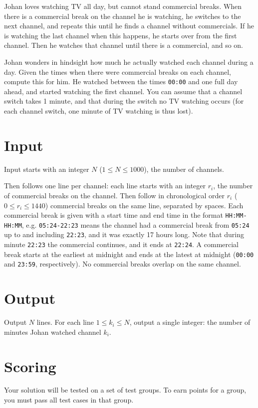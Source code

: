 Johan loves watching TV all day, but cannot stand commercial breaks. When there is a commercial break on the channel
he is watching, he switches to the next channel, and repeats this until he finds a channel without commercials. If he is watching
the last channel when this happens, he starts over from the first channel. Then he watches that channel until there is a commercial, and so on.

Johan wonders in hindsight how much he actually watched each channel during a day. Given the times when there were commercial breaks on each channel,
compute this for him. He watched between the times \texttt{00:00} and one full day ahead, and started watching the first channel.
You can assume that a channel switch takes 1 minute, and that during the switch no TV watching occurs (for each channel switch, one minute of TV watching is thus lost).

\section*{Input}
Input starts with an integer $N$ ($1 \leq N \leq 1000$), the number of channels.

Then follows one line per channel: each line starts with an integer $r_i$, the number of commercial breaks on the channel.
Then follow in chronological order $r_i$ ($0 \leq r_i \leq 1440$) commercial breaks on the same line, separated by spaces.
Each commercial break is given with a start time and end time in the format \texttt{HH:MM-HH:MM}, e.g. \texttt{05:24-22:23} means the channel had
a commercial break from \texttt{05:24} up to and including \texttt{22:23}, and it was exactly 17 hours long. Note that during minute \texttt{22:23} the commercial continues,
and it ends at \texttt{22:24}. A commercial break starts at the earliest at midnight and ends at the latest at midnight (\texttt{00:00} and \texttt{23:59}, respectively).
No commercial breaks overlap on the same channel.

\section*{Output}
Output $N$ lines. For each line $1 \leq k_i \leq N$, output a single integer: the number of minutes Johan watched channel $k_i$.

\section*{Scoring}
Your solution will be tested on a set of test groups.
To earn points for a group, you must pass all test cases in that group.

